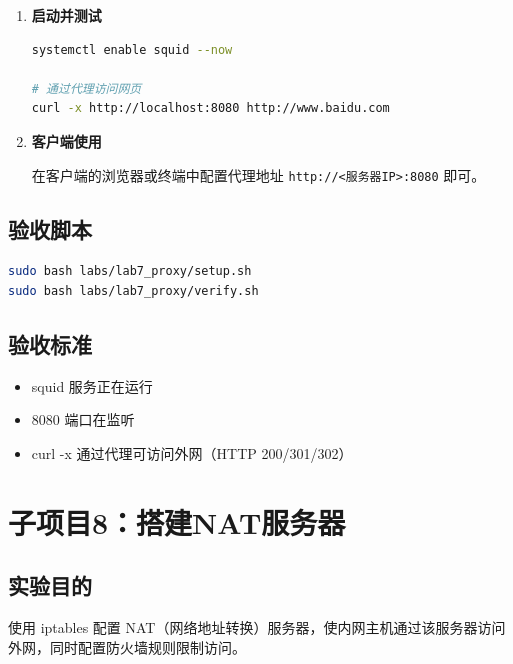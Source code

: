 \documentclass[12pt,a4paper]{ctexart}
\begin{document}
\begin{enumerate}[label=\arabic*.,leftmargin=*]
  \item \textbf{启动并测试}

  \begin{cmdbox}
  \begin{lstlisting}[language=bash]
systemctl enable squid --now

# 通过代理访问网页
curl -x http://localhost:8080 http://www.baidu.com
  \end{lstlisting}
  \end{cmdbox}

  \item \textbf{客户端使用}

  在客户端的浏览器或终端中配置代理地址 \texttt{http://<服务器IP>:8080} 即可。

\end{enumerate}

\subsection{验收脚本}

\begin{cmdbox}
\begin{lstlisting}[language=bash]
sudo bash labs/lab7_proxy/setup.sh
sudo bash labs/lab7_proxy/verify.sh
\end{lstlisting}
\end{cmdbox}

\subsection{验收标准}

\begin{itemize}
  \item squid 服务正在运行
  \item 8080 端口在监听
  \item curl -x 通过代理可访问外网（HTTP 200/301/302）
\end{itemize}

\newpage
\section{子项目8：搭建NAT服务器}

\subsection{实验目的}

使用 iptables 配置 NAT（网络地址转换）服务器，使内网主机通过该服务器访问外网，同时配置防火墙规则限制访问。
\end{document}
